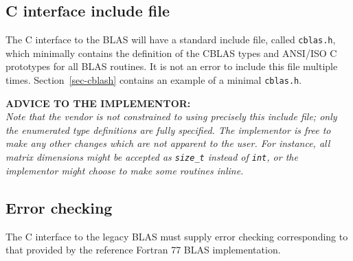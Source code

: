 \documentclass{article}
\begin{document}
\subsection{C interface include file}\label{legacy:c_includefile}


The C interface to the BLAS will have a standard include file, called 
{\tt cblas.h}, which minimally contains the definition of the CBLAS types
and ANSI/ISO C prototypes for all BLAS routines.  
It is not an error to include this file multiple times.
Section~\ref{sec-cblash} contains an example of a minimal {\tt cblas.h}.

{{\bf ADVICE TO THE IMPLEMENTOR:}\\ \em
Note that the vendor is not constrained to using precisely
this include file; only the enumerated type definitions are fully specified.
The implementor is free to make any other changes which are not apparent
to the user.  For instance, all matrix dimensions might be accepted as
{\tt size\_t} instead of {\tt int}, or the implementor might choose to
make some routines inline.
}

\subsection{Error checking}\label{legacy:c_errorchecking}


The C interface to the legacy BLAS must supply error checking corresponding
to that provided by the reference Fortran 77 BLAS implementation.
\end{document}
